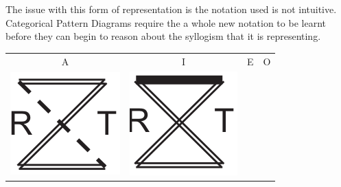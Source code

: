 \documentclass[12pt,a4paper]{report}
\begin{document}
The issue with this form of representation is the notation used is not intuitive. Categorical Pattern Diagrams require the a whole new notation to be learnt before they can begin to reason about the syllogism that it is representing.

\begin{table}[h!]
  \centering
  \begin{tabular}{  c  c  c  c }
    A & I & E & O\\
    \begin{minipage}{.22\textwidth}
      \includegraphics[width=\linewidth, scale=0.5]{CPDA}
    \end{minipage}
    &
    \begin{minipage}{.22\textwidth}
      \includegraphics[width=\linewidth, scale=0.5]{CPDI}

\end{minipage}
\end{tabular}
\end{table}
\end{document}
